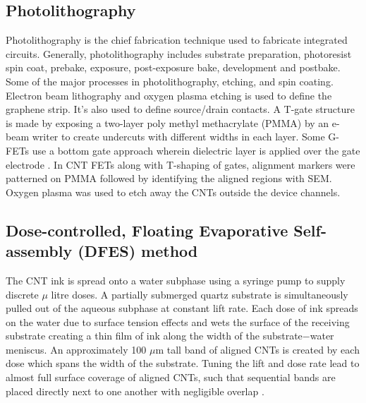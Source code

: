 \documentclass[a4paper,11pt]{article}
\begin{document}
\subsection{Photolithography}
Photolithography is the chief fabrication technique used to fabricate integrated circuits. Generally, photolithography includes substrate preparation, photoresist spin coat, prebake, exposure, post-exposure bake, development and postbake. Some of the major processes in photolithography, etching, and spin coating.     
\newline 
Electron beam lithography and oxygen plasma etching is used to define the graphene strip. It's also used to define source/drain contacts. A T-gate structure is made by exposing a two-layer poly methyl methacrylate (PMMA) by an e-beam writer to create undercuts with different widths in each layer\cite{yeh2014gigahertz}. 
Some G-FETs use a bottom gate approach wherein dielectric layer is applied over the gate electrode \cite{petrone2012graphene}.
In CNT FETs along with T-shaping of gates, alignment markers were patterned on PMMA followed by identifying the aligned regions with SEM. Oxygen plasma was used to etch away the CNTs outside the device channels.

\subsection{Dose-controlled, Floating Evaporative Self-assembly (DFES) method \cite{joo2014dose}}
The CNT ink is spread onto a water subphase using a syringe pump to supply discrete $\mu$ litre doses. A partially submerged quartz substrate is simultaneously pulled out of the aqueous subphase at constant lift rate. Each dose of ink spreads on the water due to surface tension effects and wets the surface of the receiving substrate creating a thin film of ink along the width of the substrate−water meniscus. An approximately 100 $\mu$m tall band of aligned CNTs is created by each dose which spans the width of the substrate. Tuning the lift and dose rate lead to almost full surface coverage of aligned CNTs, such that sequential bands are placed directly next to one another with negligible overlap \cite{cao2016radio}.
\end{document}
